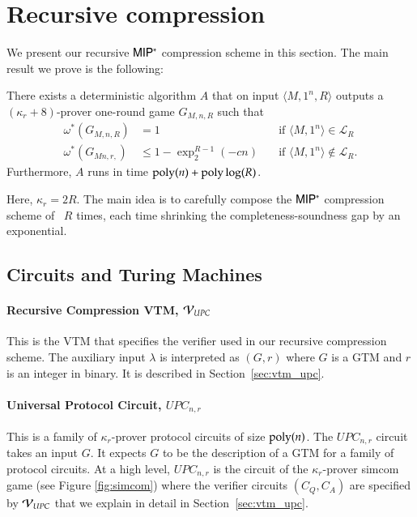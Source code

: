 
\section{Recursive compression}

We present our recursive ${\sf MIP^*}$ compression scheme in this section. The main result we prove is the following:

\begin{theorem}
	There exists a deterministic algorithm $A$ that on input $\langle M, 1^n, R \rangle$ outputs a $(\kappa_r + 8)$-prover one-round game $G_{M,n,R}$ such that 
\begin{align*}
		\omega^*(G_{M,n,R}) &= 1  \quad & \text{if } \langle M,1^n \rangle\in \mathcal{L}_R \\
		\omega^*(G_{Mn,r,}) &\leq 1 - \exp^{R-1}_2(-cn) \quad &\text{if } \langle M,1^n \rangle\notin \mathcal{L}_R.
\end{align*}
Furthermore, $A$ runs in time $\operatorname{poly}(n) + \operatorname{poly}\log(R)$.	
\end{theorem}

Here, $\kappa_r = 2R$.  The main idea is to carefully compose the ${\sf MIP^*}$ compression scheme of~\cite{ji2016compression} $R$ times, each time shrinking the completeness-soundness gap by an exponential. 



\subsection{Circuits and Turing Machines}


\paragraph{Recursive Compression VTM, $\mathcal V_{UPC}$} This is the VTM that specifies the verifier used in our recursive compression scheme. The auxiliary input $\lambda$ is interpreted as $(G,r)$ where $G$ is a GTM and $r$ is an integer in binary. It is described in Section~\ref{sec:vtm_upc}. 

\paragraph{Universal Protocol Circuit, $UPC_{n,r}$} This is a family of $\kappa_r$-prover protocol circuits of size $\operatorname{poly}(n)$. The $UPC_{n,r}$ circuit takes an input $G$. It expects $G$ to be the description of a GTM for a family of protocol circuits. At a high level, $UPC_{n,r}$ is the circuit of the $\kappa_r$-prover simcom game (see Figure \ref{fig:simcom}) where the verifier circuits $(C_Q,C_A)$ are specified by $\mathcal V_{UPC}$ that we explain in detail in Section~\ref{sec:vtm_upc}. 

